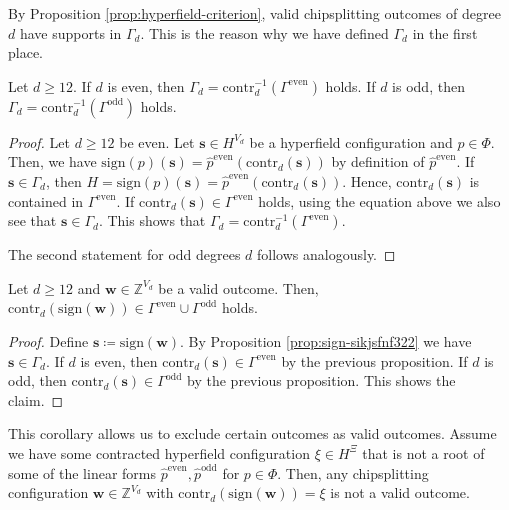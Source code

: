 By Proposition \ref{prop:hyperfield-criterion}, valid chipsplitting outcomes of degree \( d \) have supports in \( \Gamma_d \). This is the reason why we have defined \( \Gamma_d \) in the first place. 

\begin{proposition}\label{prop:sign-sikjsfnf3223423432}
    Let \( d \geq 12 \). If \( d \) is even, then \( \Gamma_d = \mathrm{contr}_d^{-1}(\Gamma^{\mathrm{even}}) \) holds. If \( d \) is odd, then \( \Gamma_d = \mathrm{contr}_d^{-1}(\Gamma^{\mathrm{odd}}) \) holds.
\end{proposition}

\begin{proof}
    Let \( d \geq 12 \) be even. Let \( \mathbf{s} \in {H}^{V_d} \) be a hyperfield configuration and \( p \in \Phi \). Then, we have \( \mathrm{sign}(p)(\mathbf{s}) = \hat p^{\mathrm{even}}(\mathrm{contr}_d(\mathbf{s})) \)
    by definition of \( \hat p^{\mathrm{even}} \). If \( \mathbf{s} \in \Gamma_d \), then \( H = \mathrm{sign}(p)(\mathbf{s}) = \hat p^{\mathrm{even}}(\mathrm{contr}_d(\mathbf{s})) \). Hence, \( \mathrm{contr}_d(\mathbf{s}) \) is contained in \( \Gamma^{\mathrm{even}} \). If \( \mathrm{contr}_d(\mathbf{s}) \in \Gamma^{\mathrm{even}} \) holds, using the equation above we also see that \( \mathbf{s} \in \Gamma_d \). This shows that \( \Gamma_d = \mathrm{contr}_d^{-1}(\Gamma^{\mathrm{even}}) \).

    The second statement for odd degrees \( d \) follows analogously.
\end{proof}

\begin{corollary}\label{cor:validwunfwufneuiw}
    Let \( d \geq 12 \) and \( \mathbf{w} \in \mathbb{Z}^{V_d} \) be a valid outcome. Then, \( \mathrm{contr}_d(\mathrm{sign}(\mathbf{w})) \in \Gamma^{\mathrm{even}} \cup \Gamma^{\mathrm{odd}} \) holds.
\end{corollary}

\begin{proof}
    Define \( \mathbf{s} \coloneqq \mathrm{sign}(\mathbf{w}) \). By Proposition \ref{prop:sign-sikjsfnf322} we have \( \mathbf{s} \in \Gamma_d \). If \( d \) is even, then \( \mathrm{contr}_d(\mathbf{s}) \in \Gamma^{\mathrm{even}} \) by the previous proposition. If \( d \) is odd, then \( \mathrm{contr}_d(\mathbf{s}) \in \Gamma^{\mathrm{odd}} \) by the previous proposition. This shows the claim.
\end{proof}

This corollary allows us to exclude certain outcomes as valid outcomes. Assume we have some contracted hyperfield configuration \( \xi \in H^{\Xi} \) that is not a root of some of the linear forms \( \hat p^{\mathrm{even}}, \hat p^{\mathrm{odd}} \) for \( p \in \Phi \). Then, any chipsplitting configuration \( \mathbf{w} \in \mathbb{Z}^{V_d} \) with \( \mathrm{contr}_d( \mathrm{sign}(\mathbf{w})) = \xi \) is not a valid outcome.

